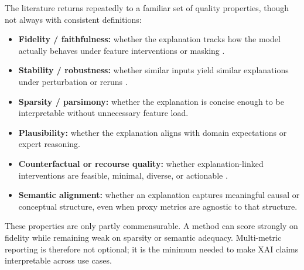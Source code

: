 \documentclass[fleqn,10pt,lineno]{wlpeerj}
\begin{document}
The literature returns repeatedly to a familiar set of quality properties,
though not always with consistent definitions:
\begin{itemize}[leftmargin=*]
\item \textbf{Fidelity / faithfulness:} whether the explanation tracks
how the model actually behaves under feature interventions or masking
\citep{ribeiro2016why,lundberg2017unified,zheng2025ffidelity}.
\item \textbf{Stability / robustness:} whether similar inputs yield
similar explanations under perturbation or reruns
\citep{pawlicki2024metrics,canha2025benchmark}.
\item \textbf{Sparsity / parsimony:} whether the explanation is concise
enough to be interpretable without unnecessary feature load.
\item \textbf{Plausibility:} whether the explanation aligns with domain
expectations or expert reasoning.
\item \textbf{Counterfactual or recourse quality:} whether
explanation-linked interventions are feasible, minimal, diverse, or
actionable \citep{mothilal2020dice}.
\item \textbf{Semantic alignment:} whether an explanation captures
meaningful causal or conceptual structure, even when proxy metrics are
agnostic to that structure.
\end{itemize}

These properties are only partly commensurable. A method can score
strongly on fidelity while remaining weak on sparsity or semantic
adequacy. Multi-metric reporting is therefore not optional; it is the
minimum needed to make XAI claims interpretable across use cases.
\end{document}
